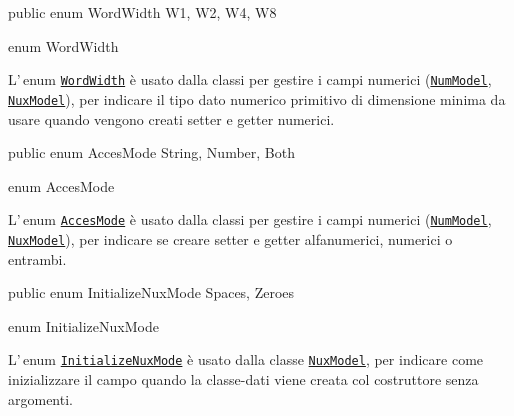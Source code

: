 \documentclass[a4paper,10pt]{report}
\newif\ifesource
\newenvironment{elisting}[1][!htb]
  {\captionsetup{aboveskip=0pt}\begin{listing}[#1]}
  {\end{listing}%
}
\begin{document}
\ifesource
\begin{lstlisting}[language=java, 
caption=enum WordWidth, 
label=lst:WordWidth]
public enum WordWidth { W1, W2, W4, W8 }
\end{lstlisting}\index{WordWidth}
\else
\begin{elisting}
\begin{javacode}
public enum WordWidth { W1, W2, W4, W8 }
\end{javacode}
\caption{enum WordWidth}\label{lst:WordWidth}
\end{elisting}
\fi
L'\,enum \hyperref[lst:WordWidth]{\texttt{WordWidth}} è usato 
dalla classi per gestire i campi numerici 
(\hyperref[lst:NumModel]{\texttt{NumModel}},
\hyperref[lst:NuxModel]{\texttt{NuxModel}}), per indicare il tipo dato numerico
primitivo di dimensione minima da usare quando vengono creati setter e getter
numerici.

\ifesource
\begin{lstlisting}[language=java, 
caption=enum AccesMode, 
label=lst:AccesMode]
public enum AccesMode { String, Number, Both }
\end{lstlisting}\index{AccesMode}
\else
\begin{elisting}
\begin{javacode}
public enum AccesMode { String, Number, Both }
\end{javacode}
\caption{enum AccesMode}\label{lst:AccesMode}
\end{elisting}
\fi
L'\,enum \hyperref[lst:AccesMode]{\texttt{AccesMode}} è usato 
dalla classi per gestire i campi numerici 
(\hyperref[lst:NumModel]{\texttt{NumModel}},
\hyperref[lst:NuxModel]{\texttt{NuxModel}}), per indicare se creare setter e
getter alfanumerici, numerici o entrambi.


\ifesource
\begin{lstlisting}[language=java, 
caption=enum InitializeNuxMode, 
label=lst:InitializeNuxMode]
public enum InitializeNuxMode { Spaces, Zeroes }
\end{lstlisting}\index{InitializeNuxMode}
\else
\begin{elisting}
\begin{javacode}
public enum InitializeNuxMode { Spaces, Zeroes }
\end{javacode}
\caption{enum InitializeNuxMode}\label{lst:InitializeNuxMode}
\end{elisting}
\fi
L'\,enum \hyperref[lst:InitializeNuxMode]{\texttt{InitializeNuxMode}} è usato 
dalla classe \hyperref[lst:NuxModel]{\texttt{NuxModel}}, per indicare come 
inizializzare il campo quando la classe-dati viene creata col costruttore senza
argomenti.
\end{document}
